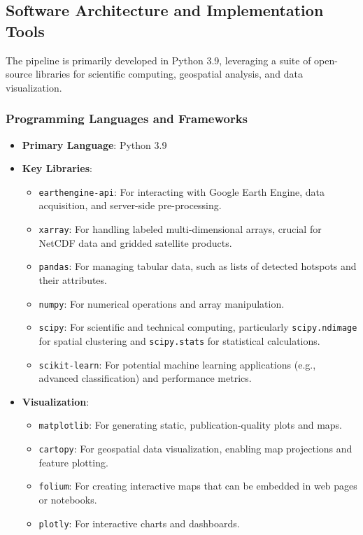 \documentclass[12pt,a4paper]{article}
\begin{document}
\subsection{Software Architecture and Implementation Tools}
The pipeline is primarily developed in Python 3.9, leveraging a suite of open-source libraries for scientific computing, geospatial analysis, and data visualization.

\subsubsection{Programming Languages and Frameworks}
\begin{itemize}
    \item \textbf{Primary Language}: Python 3.9
    \item \textbf{Key Libraries}:
    \begin{itemize}
        \item \texttt{earthengine-api}: For interacting with Google Earth Engine, data acquisition, and server-side pre-processing.
        \item \texttt{xarray}: For handling labeled multi-dimensional arrays, crucial for NetCDF data and gridded satellite products.
        \item \texttt{pandas}: For managing tabular data, such as lists of detected hotspots and their attributes.
        \item \texttt{numpy}: For numerical operations and array manipulation.
        \item \texttt{scipy}: For scientific and technical computing, particularly \texttt{scipy.ndimage} for spatial clustering and \texttt{scipy.stats} for statistical calculations.
        \item \texttt{scikit-learn}: For potential machine learning applications (e.g., advanced classification) and performance metrics.
    \end{itemize}
    \item \textbf{Visualization}:
    \begin{itemize}
        \item \texttt{matplotlib}: For generating static, publication-quality plots and maps.
        \item \texttt{cartopy}: For geospatial data visualization, enabling map projections and feature plotting.
        \item \texttt{folium}: For creating interactive maps that can be embedded in web pages or notebooks.
        \item \texttt{plotly}: For interactive charts and dashboards.

\end{itemize}
\end{itemize}
\end{document}
